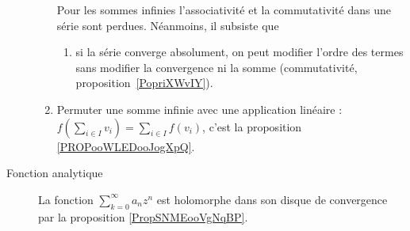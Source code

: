 \begin{description}
\begin{enumerate}
    Pour les sommes infinies l'associativité et la commutativité dans une série sont perdues. Néanmoins, il subsiste que
  \begin{enumerate}
  \item
      si la série converge absolument, on peut modifier l'ordre des termes sans modifier la convergence ni la somme (commutativité, proposition~\ref{PopriXWvIY}).
  \end{enumerate}
  \item Permuter une somme infinie avec une application linéaire : \( f(\sum_{i\in I}v_i)=\sum_{i\in I}f(v_i)\), c'est la proposition \ref{PROPooWLEDooJogXpQ}.
        \end{enumerate}
    \item[Fonction analytique]
        La fonction \( \sum_{k=0}^{\infty}a_nz^n\) est holomorphe dans son disque de convergence par la proposition \ref{PropSNMEooVgNqBP}.
\end{description}



